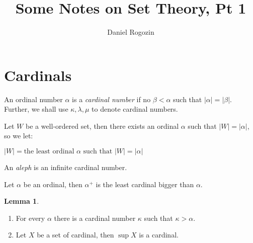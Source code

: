 \documentclass[8pt]{article}
\title{Some Notes on Set Theory, Pt 1}
\author{Daniel Rogozin}
\date{ }
\theoremstyle{definition}
\theoremstyle{definition}
\theoremstyle{definition}
\theoremstyle{definition}
\theoremstyle{definition}
\theoremstyle{definition}
\theoremstyle{definition}
\theoremstyle{definition}
\newtheorem{lemma}{Lemma}[section]
\theoremstyle{definition}
\theoremstyle{definition}
\theoremstyle{definition}
\theoremstyle{definition}
\theoremstyle{col}
\theoremstyle{question}
\begin{document}
\maketitle

\section{Cardinals}

An ordinal number $\alpha$ is a \emph{cardinal number} if no $\beta < \alpha$ such that $|\alpha| = |\beta|$.
Further, we shall use $\kappa, \lambda, \mu$ to denote cardinal numbers.

Let $W$ be a well-ordered set, then there exists an ordinal $\alpha$ such that $|W| = |\alpha|$, so we let:
\begin{center}
  $|W| = \text{the least ordinal $\alpha$ such that $|W| = |\alpha|$}$
\end{center}

An \emph{aleph} is an infinite cardinal number. 

Let $\alpha$ be an ordinal, then $\alpha^+$ is the least cardinal bigger than $\alpha$.

\begin{lemma}
  $ $

  \begin{enumerate}
    \item For every $\alpha$ there is a cardinal number $\kappa$ such that $\kappa > \alpha$.
    \item Let $X$ be a set of cardinal, then $\sup X$ is a cardinal.
  \end{enumerate}
\end{lemma}
\end{document}
